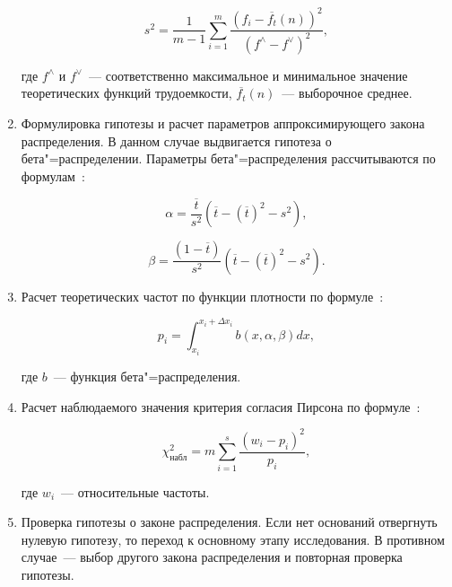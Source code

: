 \documentclass[a4paper, article, 14pt]{extarticle}
\begin{document}
\begin{enumerate}
	\begin{equation}\label{eq:variance}
		s^2 = \frac{1}{m - 1} \sum_{i=1}^{m}{\frac{(f_i - \overline{f_t}(n))^2}{(f^\wedge - f^\vee)^2}},
	\end{equation}
	
	где $f^\wedge$ и $f^\vee$~--- соответственно максимальное и минимальное значение теоретических функций трудоемкости, $\overline{f_t}(n)$~--- выборочное среднее.
	
	\item Формулировка гипотезы и расчет параметров аппроксимирующего закона распределения. В данном случае выдвигается гипотеза о бета"=распределении. Параметры бета"=распределения рассчитываются по формулам~\cite{petrushyn_ulyanov_planning}:
	
	\begin{equation}\label{eq:alpha}
		\alpha = \frac{\overline{t}}{s^2} (\overline{t} - (\overline{t})^2 - s^2),
	\end{equation}
	
	\begin{equation}\label{eq:beta}
		\beta = \frac{(1 - \overline{t})}{s^2} (\overline{t} - (\overline{t})^2 - s^2).
	\end{equation}
	
	\item Расчет теоретических частот по функции плотности по формуле~\cite{petrushyn_ulyanov_planning}:
	
	\begin{equation}\label{eq:frequency}
		p_i = \int_{x_i}^{x_i + \Delta x_i}{b(x, \alpha, \beta) dx},
	\end{equation}
	
	где $b$~--- функция бета"=распределения.
	
	\item Расчет наблюдаемого значения критерия согласия Пирсона по формуле~\cite{koroluk}:
	
	\begin{equation}\label{eq:pirson_criteria_concrete}
		\chi_{\text{набл}}^2 = m \sum_{i=1}^{s} \frac{(w_i - p_i)^2}{p_i},
	\end{equation}
	
	где $w_i$~--- относительные частоты.
	
	\item Проверка гипотезы о законе распределения. Если нет оснований отвергнуть нулевую гипотезу, то переход к основному этапу исследования. В противном случае~--- выбор другого закона распределения и повторная проверка гипотезы.
\end{enumerate}
\end{document}
